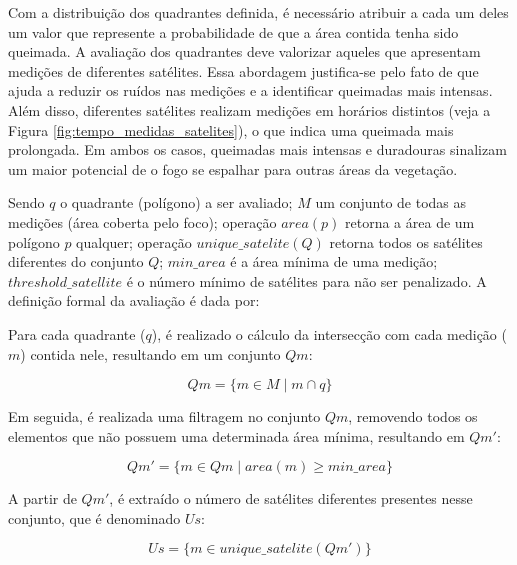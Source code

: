 \documentclass[cic,tc]{iiufrgs}
\begin{document}
Com a distribuição dos quadrantes definida, é necessário atribuir a cada um deles um valor que represente a probabilidade de que a área contida tenha sido queimada. A avaliação dos quadrantes deve valorizar aqueles que apresentam medições de diferentes satélites. Essa abordagem justifica-se pelo fato de que ajuda a reduzir os ruídos nas medições e a identificar queimadas mais intensas. Além disso, diferentes satélites realizam medições em horários distintos (veja a Figura \ref{fig:tempo_medidas_satelites}), o que indica uma queimada mais prolongada. Em ambos os casos, queimadas mais intensas e duradouras sinalizam um maior potencial de o fogo se espalhar para outras áreas da vegetação. \par

Sendo $q$ o quadrante (polígono) a ser avaliado; $M$ um conjunto de todas as medições (área coberta pelo foco); operação $area(p)$ retorna a área de um polígono $p$ qualquer; operação $unique\_satelite(Q)$ retorna todos os satélites diferentes do conjunto $Q$; $min\_area$ é a área mínima de uma medição; $threshold\_satellite$ é o número mínimo de satélites para não ser penalizado. A definição formal da avaliação é dada por: \par

Para cada quadrante ($q$), é realizado o cálculo da intersecção com cada medição ($m$) contida nele, resultando em um conjunto $Qm$: \par

\begin{equation} \label{eqn:def_qm}
Qm = \{ m \in M \mid m \cap q \}
\end{equation}

Em seguida, é realizada uma filtragem no conjunto $Qm$, removendo todos os elementos que não possuem uma determinada área mínima, resultando em $Qm'$: \par

\begin{equation} \label{eqn:def_qm_line}
Qm' = \{ m \in Qm \mid area\left(m\right) \ge min\_area \}
\end{equation}

A partir de $Qm'$, é extraído o número de satélites diferentes presentes nesse conjunto, que é denominado $Us$: \par

\begin{equation} \label{eqn:def_us}
Us = \{ m \in unique\_satelite\left(Qm'\right) \}
\end{equation}
\end{document}
